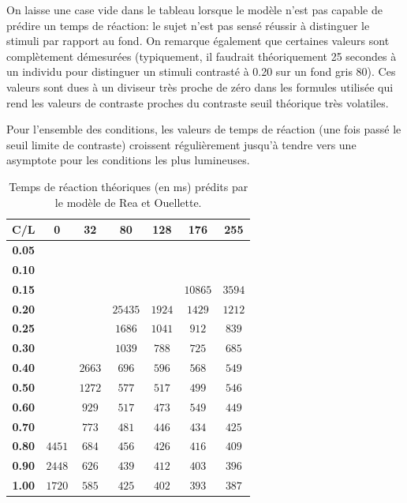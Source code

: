 	\par On laisse une case vide dans le tableau lorsque le modèle n'est pas capable de prédire un temps de réaction: le sujet n'est pas sensé réussir à distinguer le stimuli par rapport au fond. On remarque également que certaines valeurs sont complètement démesurées (typiquement, il faudrait théoriquement 25 secondes à un individu pour distinguer un stimuli contrasté à 0.20 sur un fond gris 80). Ces valeurs sont dues à un diviseur très proche de zéro dans les formules utilisée qui rend les valeurs de contraste proches du contraste seuil théorique très volatiles.
	
	\par Pour l'ensemble des conditions, les valeurs de temps de réaction (une fois passé le seuil limite de contraste) croissent régulièrement jusqu'à tendre vers une asymptote pour les conditions les plus lumineuses.
	
	\begin{table}[h]	
		\centering
		\caption{Temps de réaction théoriques (en ms) prédits par le modèle de Rea et Ouellette.}
		\label{tab:theoretical_reaction_times}
		\begin{tabular}{c|cccccc}
			\textbf{C/L} & \textbf{0} & \textbf{32} & \textbf{80} & \textbf{128} & \textbf{176} & \textbf{255}\\
			\hline
			\textbf{0.05}\\
			\textbf{0.10}\\
			\textbf{0.15} &  &  &  &  & $10865$ & $3594$\\
			\textbf{0.20} &  &  & $25435$ & $1924$ & $1429$ & $1212$\\
			\textbf{0.25} &  &  & $1686$ & $1041$ & $912$ & $839$\\
			\textbf{0.30} &  &  & $1039$ & $788$ & $725$ & $685$\\
			\textbf{0.40} &  & $2663$ & $696$ & $596$ & $568$ & $549$\\
			\textbf{0.50} &  & $1272$ & $577$ & $517$ & $499$ & $546$\\
			\textbf{0.60} &  & $929$ & $517$ & $473$ & $549$ & $449$\\
			\textbf{0.70} &  & $773$ & $481$ & $446$ & $434$ & $425$\\
			\textbf{0.80} & $4451$ & $684$ & $456$ & $426$ & $416$ & $409$\\
			\textbf{0.90} & $2448$ & $626$ & $439$ & $412$ & $403$ & $396$\\
			\textbf{1.00} & $1720$ & $585$ & $425$ & $402$ & $393$ & $387$\\
		\end{tabular}
	\end{table}
	
